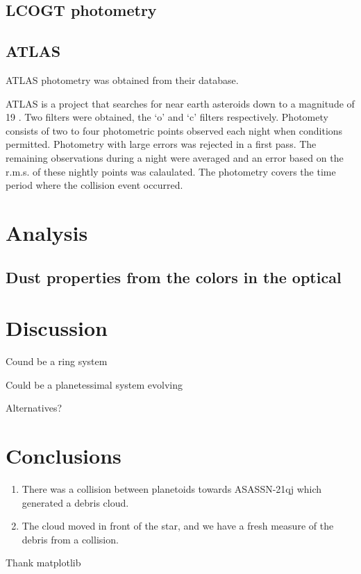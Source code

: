 \documentclass{aa}
\begin{document}
\subsection{LCOGT photometry}

\subsection{ATLAS}

ATLAS photometry was obtained from their database.



ATLAS is a project that searches for near earth asteroids down to a magnitude of 19 
\citep{Tonry18}.
%
Two filters were obtained, the `o' and `c' filters respectively.
%
Photomety consists of two to four photometric points observed each night when conditions permitted.
%
Photometry with large errors was rejected in a first pass.
%
The remaining observations during a night were averaged and an error based on the r.m.s. of these nightly points was calaulated.
%
The photometry covers the time period where the collision event occurred. 


\section{Analysis}\label{sec:dustcloud}

\subsection{Dust properties from the colors in the optical}

\section{Discussion}\label{sec:discussion}

Cound be a ring system

Could be a planetessimal system evolving

Alternatives?

\section{Conclusions}\label{sec:conclusion}

   \begin{enumerate}
      \item There was a collision between planetoids towards ASASSN-21qj which generated a debris cloud.
      \item The cloud moved in front of the star, and we have a fresh measure of the debris from a collision.
   \end{enumerate}

\begin{acknowledgements}
Thank matplotlib

\end{acknowledgements}



\end{document}

